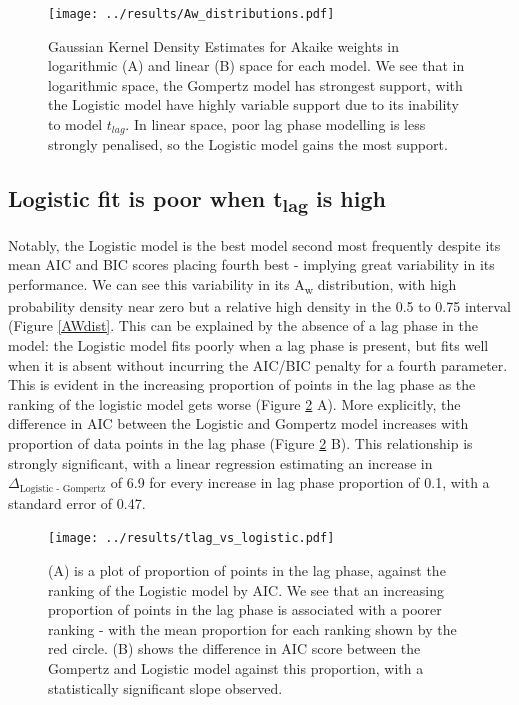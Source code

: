 \documentclass[11pt, a4paper]{article}
\begin{document}
\begin{linenumbers}
        \begin{figure}[H]
        \texttt{[image: ../results/Aw\_distributions.pdf]}
        \caption{Gaussian Kernel Density Estimates for Akaike weights in logarithmic (A) and linear (B) space for each model. We see that in logarithmic space, the Gompertz model has strongest support, with the Logistic model have highly variable support due to its inability to model $t_{lag}$. In linear space, poor lag phase modelling is less strongly penalised, so the Logistic model gains the most support. }
        \label{fig:AWdist}
        \end{figure}
        
        

        
        \subsection{Logistic fit is poor when t\textsubscript{lag} is high}
                
        Notably, the Logistic model is the best model second most frequently despite its mean AIC and BIC scores placing fourth best - implying great variability in its performance. We can see this variability in its A\textsubscript{w} distribution, with high probability density near zero but a relative high density in the 0.5 to 0.75 interval (Figure \ref{AWdist}.  This can be explained by the absence of a lag phase in the model: the Logistic model fits poorly when a lag phase is present, but fits well when it is absent without incurring the AIC/BIC penalty for a fourth parameter. This is evident in the increasing proportion of points in the lag phase as the ranking of the logistic model gets worse (Figure \ref{fig:logistic_tlag} A). More explicitly, the difference in AIC between the Logistic and Gompertz model increases with proportion of data points in the lag phase (Figure \ref{fig:logistic_tlag} B). This relationship is strongly significant, with a linear regression estimating an increase in $\Delta_{\text{Logistic - Gompertz}}$ of 6.9 for every increase in lag phase proportion of 0.1, with a standard error of 0.47.
        
                \begin{figure}[H]
        \texttt{[image: ../results/tlag\_vs\_logistic.pdf]}
        \caption{(A) is a plot of proportion of points in the lag phase, against the ranking of the Logistic model by AIC. We see that an increasing proportion of points in the lag phase is associated with a poorer ranking - with the mean proportion for each ranking shown by the red circle. (B) shows the difference in AIC score between the Gompertz and Logistic model against this proportion, with a statistically significant slope observed.}
        \label{fig:logistic_tlag}
        \end{figure}        
        

\end{linenumbers}
\end{document}
